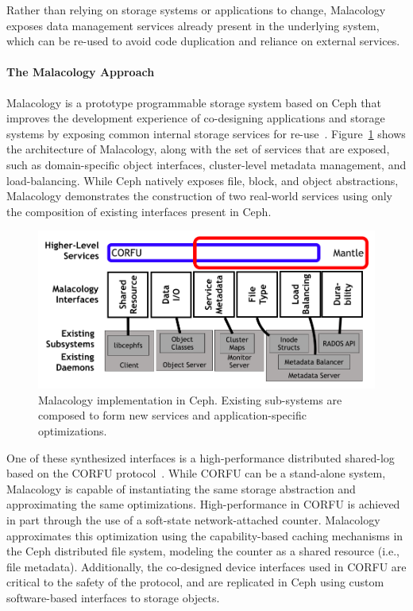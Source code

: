 Rather than relying on storage systems or applications to change, Malacology
exposes data management services already present in the underlying system,
which can be re-used to avoid code duplication and reliance on external
services.

\paragraph*{The Malacology Approach}
\label{mala}

Malacology is a prototype programmable storage system based on Ceph that
improves the development experience of co-designing applications and storage
systems by exposing common internal storage services for
re-use~\cite{sevilla:eurosys17}. Figure~\ref{fig:malacology} shows the
architecture of Malacology, along with the set of services that are exposed,
such as domain-specific object interfaces, cluster-level metadata management,
and load-balancing. While Ceph natively exposes file, block, and object
abstractions, Malacology demonstrates the construction of two real-world
services using only the composition of existing interfaces present in Ceph.

\begin{figure}[t]
\centering
\includegraphics[width=1.0\linewidth]{implementation-overview.png}
\caption{Malacology implementation in Ceph. Existing sub-systems are composed
    to form new services and application-specific optimizations.}
\label{fig:malacology}
\end{figure}

One of these synthesized interfaces is a high-performance distributed
shared-log
based on the CORFU protocol~\cite{balakrishnan:nsdi12}.  While CORFU can
be a stand-alone system, Malacology is capable of instantiating the same storage
abstraction and approximating the same optimizations. High-performance in CORFU
is achieved in part through the use of a soft-state network-attached counter.
Malacology approximates this optimization using the capability-based caching
mechanisms in the Ceph distributed file system, modeling the counter as a
shared resource (i.e., file metadata). Additionally, the co-designed device
interfaces used in CORFU are critical to the safety of the protocol, and are
replicated in Ceph using custom software-based interfaces to storage objects.

